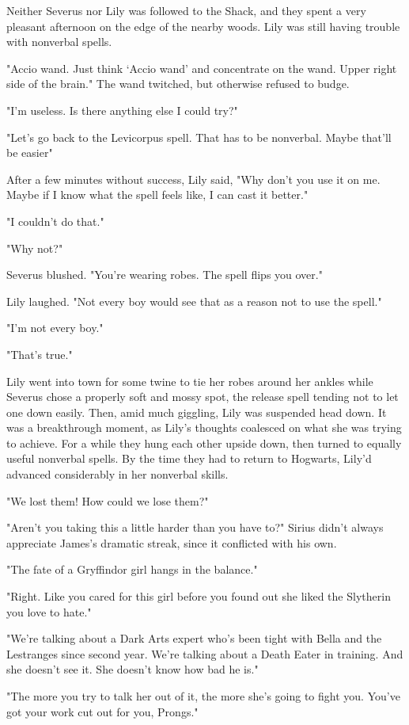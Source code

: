 \documentclass[a4paper,11pt]{article}
\begin{document}
Neither Severus nor Lily was followed to the Shack, and they spent a very pleasant afternoon on the edge of the nearby woods. Lily was still having trouble with nonverbal spells.

"Accio wand. Just think `Accio wand' and concentrate on the wand. Upper right side of the brain." The wand twitched, but otherwise refused to budge.

"I'm useless. Is there anything else I could try?"

"Let's go back to the Levicorpus spell. That has to be nonverbal. Maybe that'll be easier"

After a few minutes without success, Lily said, "Why don't you use it on me. Maybe if I know what the spell feels like, I can cast it better."

"I couldn't do that."

"Why not?"

Severus blushed. "You're wearing robes. The spell flips you over."

Lily laughed. "Not every boy would see that as a reason not to use the spell."

"I'm not every boy."

"That's true."

Lily went into town for some twine to tie her robes around her ankles while Severus chose a properly soft and mossy spot, the release spell tending not to let one down easily. Then, amid much giggling, Lily was suspended head down. It was a breakthrough moment, as Lily's thoughts coalesced on what she was trying to achieve. For a while they hung each other upside down, then turned to equally useful nonverbal spells. By the time they had to return to Hogwarts, Lily'd advanced considerably in her nonverbal skills.

"We lost them! How could we lose them?"

"Aren't you taking this a little harder than you have to?" Sirius didn't always appreciate James's dramatic streak, since it conflicted with his own.

"The fate of a Gryffindor girl hangs in the balance."

"Right. Like you cared for this girl before you found out she liked the Slytherin you love to hate."

"We're talking about a Dark Arts expert who's been tight with Bella and the Lestranges since second year. We're talking about a Death Eater in training. And she doesn't see it. She doesn't know how bad he is."

"The more you try to talk her out of it, the more she's going to fight you. You've got your work cut out for you, Prongs."
\end{document}
